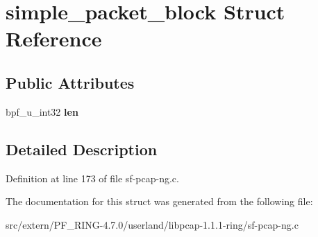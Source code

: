 \hypertarget{structsimple__packet__block}{
\section{simple\_\-packet\_\-block Struct Reference}
\label{structsimple__packet__block}
}
\subsection*{Public Attributes}
\begin{DoxyCompactItemize}
\item 
\hypertarget{structsimple__packet__block_ab16f2541eec091e37d6bbce3f0faaba5}{
bpf\_\-u\_\-int32 {\bfseries len}}
\label{structsimple__packet__block_ab16f2541eec091e37d6bbce3f0faaba5}

\end{DoxyCompactItemize}


\subsection{Detailed Description}


Definition at line 173 of file sf-\/pcap-\/ng.c.



The documentation for this struct was generated from the following file:\begin{DoxyCompactItemize}
\item 
src/extern/PF\_\-RING-\/4.7.0/userland/libpcap-\/1.1.1-\/ring/sf-\/pcap-\/ng.c\end{DoxyCompactItemize}
